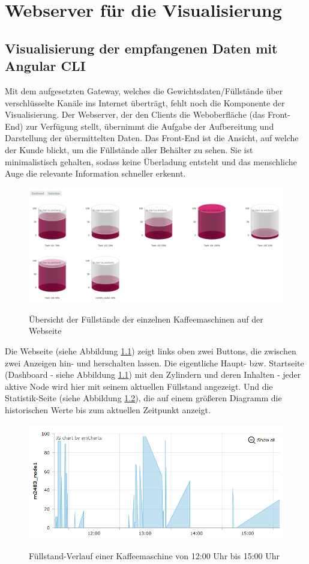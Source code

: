 \chapter{Webserver für die Visualisierung}
\section{Visualisierung der empfangenen Daten mit Angular CLI}
Mit dem aufgesetzten Gateway, welches die Gewichtsdaten/Füllstände über verschlüsselte Kanäle ins Internet überträgt, fehlt noch die Komponente der Visualisierung. Der Webserver, der den Clients die Weboberfläche (das Front-End) zur Verfügung stellt, übernimmt die Aufgabe der Aufbereitung und Darstellung der übermittelten Daten.
Das Front-End ist die Ansicht, auf welche der Kunde blickt, um die Füllstände aller Behälter zu sehen. Sie ist minimalistisch gehalten, sodass keine Überladung entsteht und das menschliche Auge die relevante Information schneller erkennt. \\
\begin{figure}[H]
    \center
    \includegraphics[width=16cm]{Bilder/front-end-1.png}\\
    \caption{Übersicht der Füllstände der einzelnen Kaffeemaschinen auf der Webseite}
    \label{fig:front-end-1}
\end{figure}
\noindent
Die Webseite (siehe Abbildung \ref{fig:front-end-1}) zeigt links oben zwei Buttons, die zwischen zwei Anzeigen hin- und herschalten lassen. Die eigentliche Haupt- bzw. Startseite (Dashboard - siehe Abbildung \ref{fig:front-end-1}) mit den Zylindern und deren Inhalten
- jeder aktive Node wird hier mit seinem aktuellen Füllstand angezeigt. Und die Statistik-Seite (siehe Abbildung \ref{fig:front-end-2}), die auf einem größeren Diagramm die historischen Werte
bis zum aktuellen Zeitpunkt anzeigt.
\begin{figure}[H]
    \center
    \includegraphics[width=16cm]{Bilder/front-end-2.png}\\
    \caption{Füllstand-Verlauf einer Kaffeemaschine von 12:00 Uhr bis 15:00 Uhr}
    \label{fig:front-end-2}
\end{figure}
